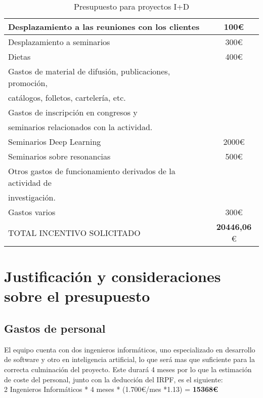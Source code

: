 \begin{table}[H]
\begin{tabular}{|l|c|}
		Desplazamiento a las reuniones con los clientes & 100\euro \\ \hline
		Desplazamiento a seminarios & 300\euro \\ \hline
		Dietas &  400\euro \\ \hline
		\cellcolor[gray]{0.8}Gastos de material de difusión, publicaciones, promoción,   \\ 
		\cellcolor[gray]{0.8}catálogos, folletos, cartelería, etc. &  \\ \hline
		\cellcolor[gray]{0.8}Gastos de inscripción en congresos y \\
		\cellcolor[gray]{0.8}seminarios relacionados con la actividad. &  \\ \hline
		Seminarios Deep Learning &  2000\euro \\ \hline
		Seminarios sobre resonancias & 500\euro  \\ \hline
		\cellcolor[gray]{0.8}Otros gastos de funcionamiento derivados de la actividad de \\
		i\cellcolor[gray]{0.8}nvestigación. &  \\ \hline
		Gastos varios & 300\euro \\ \hline
		\cellcolor{red}TOTAL INCENTIVO SOLICITADO & \textbf{20446,06} \euro \\ \bottomrule
		\end{tabular}
	\caption{Presupuesto para proyectos I+D}
	\label{tab:tabla1}
\end{table}

\section{Justificación y consideraciones sobre el presupuesto}

\subsection{Gastos de personal}

El equipo cuenta con dos ingenieros informáticos, uno especializado en desarrollo de software y otro en inteligencia artificial, lo que será mas que suficiente para la correcta culminación del proyecto. Este durará 4 meses por lo que la estimación de coste del personal, junto con la deducción del IRPF, es el siguiente: \\

2 Ingenieros Informáticos * 4 meses * (1.700\euro /mes *1.13) = \textbf{15368\euro} \\

